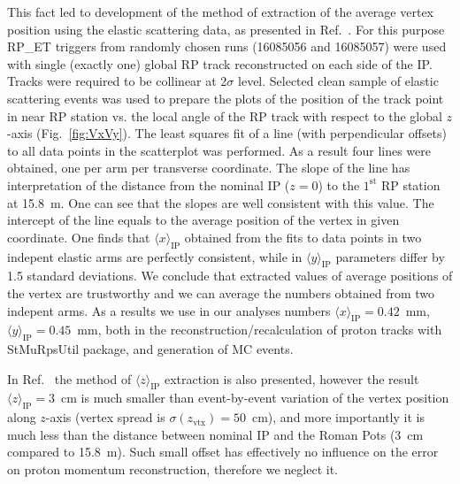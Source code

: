 This fact led to development of the method of extraction of the average vertex position using the elastic scattering data, as presented in Ref.~\cite{AverageVertex}. For this purpose RP\_ET triggers from randomly chosen runs (16085056 and 16085057) were used with single (exactly one) global RP track reconstructed on each side of the IP. Tracks were required to be collinear at 2$\sigma$ level. Selected clean sample of elastic scattering events was used to prepare the plots of the position of the track point in near RP station vs. the local angle of the RP track with respect to the global $z$-axis (Fig.~\ref{fig:VxVy}). The least squares fit of a line (with perpendicular offsets) to all data points in the scatterplot was performed. As a result four lines were obtained, one per arm per transverse coordinate. The slope of the line has interpretation of the distance from the nominal IP ($z=0$) to the $1^{\text{st}}$ RP station at 15.8~m. One can see that the slopes are well consistent with this value. The intercept of the line equals to the average position of the vertex in given coordinate. One finds that $\langle x\rangle_{\text{IP}}$ obtained from the fits to data points in two indepent elastic arms are perfectly consistent, while in $\langle y\rangle_{\text{IP}}$ parameters differ by 1.5 standard deviations. We conclude that extracted values of average positions of the vertex are trustworthy and we can average the numbers obtained from two indepent arms. As a results we use in our analyses numbers $\langle x\rangle_{\text{IP}} = 0.42$~mm, $\langle y\rangle_{\text{IP}} = 0.45$~mm, both in the reconstruction/recalculation of proton tracks with StMuRpsUtil package, and generation of MC events.

In Ref.~\cite{AverageVertex} the method of $\langle z\rangle_{\text{IP}}$ extraction is also presented, however the result $\langle z\rangle_{\text{IP}}= 3$~cm is much smaller than event-by-event variation of the vertex position along $z$-axis (vertex spread is $\sigma(z_{\text{vtx}})=50$~cm), and more importantly it is much less than the distance between nominal IP and the Roman Pots (3~cm compared to 15.8~m). Such small offset has effectively no influence on the error on proton momentum reconstruction, therefore we neglect it.

